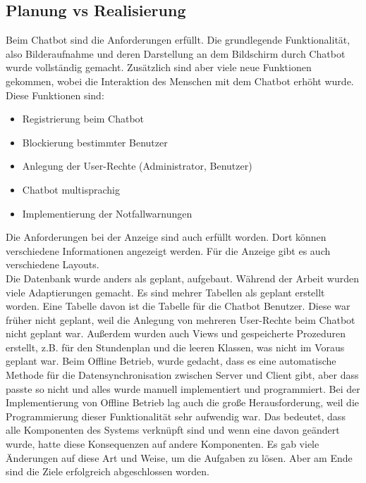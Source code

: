 \subsection{Planung vs Realisierung}
Beim Chatbot sind die Anforderungen erfüllt. Die grundlegende Funktionalität, also Bilderaufnahme und deren Darstellung an dem Bildschirm durch Chatbot wurde vollständig gemacht. Zusätzlich sind aber viele neue Funktionen gekommen, wobei die Interaktion des Menschen mit dem Chatbot erhöht wurde. \\
Diese Funktionen sind:
\begin{itemize}
	\item Registrierung beim Chatbot
\end{itemize}
\begin{itemize}
	\item Blockierung bestimmter Benutzer
\end{itemize}
\begin{itemize}
	\item Anlegung der User-Rechte (Administrator, Benutzer)
\end{itemize}
\begin{itemize}
	\item Chatbot multisprachig
\end{itemize}
\begin{itemize}
	\item Implementierung der Notfallwarnungen
\end{itemize}
Die Anforderungen bei der Anzeige sind auch erfüllt worden. Dort können verschiedene Informationen angezeigt werden. Für die Anzeige gibt es auch verschiedene Layouts. \\
Die Datenbank wurde anders als geplant, aufgebaut. Während der Arbeit wurden viele Adaptierungen gemacht. Es sind mehrer Tabellen als geplant erstellt worden. Eine Tabelle davon ist die Tabelle für die Chatbot Benutzer. Diese war früher nicht geplant, weil die Anlegung von mehreren User-Rechte beim Chatbot nicht geplant war. Au\ss{}erdem wurden auch Views und gespeicherte Prozeduren erstellt, z.B. f\"ur den Stundenplan und die leeren Klassen, was nicht im Voraus geplant war. Beim Offline Betrieb, wurde gedacht, dass es eine automatische Methode f\"ur die Datensynchronisation zwischen Server und Client gibt, aber dass passte so nicht und alles wurde manuell implementiert und programmiert. Bei der Implementierung von Offline Betrieb lag auch die gro\ss{}e Herausforderung, weil die Programmierung dieser Funktionalit\"at sehr aufwendig war. Das bedeutet, dass alle Komponenten des Systems verkn\"upft sind und wenn eine davon geändert wurde, hatte diese Konsequenzen auf andere Komponenten. Es gab viele \"Anderungen auf diese Art und Weise, um die Aufgaben zu l\"osen. Aber am Ende sind die Ziele erfolgreich abgeschlossen worden. 
